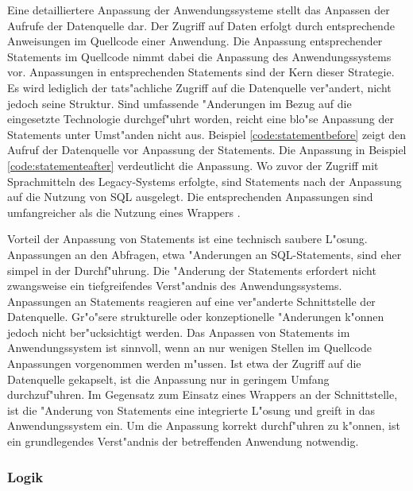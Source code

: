 Eine detailliertere Anpassung der Anwendungssysteme stellt das Anpassen der Aufrufe der Datenquelle dar. Der Zugriff auf Daten erfolgt durch entsprechende Anweisungen im Quellcode einer Anwendung. Die Anpassung entsprechender Statements im Quellcode nimmt dabei die Anpassung des Anwendungssystems vor. Anpassungen in entsprechenden Statements sind der Kern dieser Strategie. Es wird lediglich der tats"achliche Zugriff auf die Datenquelle ver"andert, nicht jedoch seine Struktur. Sind umfassende "Anderungen im Bezug auf die eingesetzte Technologie durchgef"uhrt worden, reicht eine blo"se Anpassung der Statements unter Umst"anden nicht aus.
\lb
Beispiel \ref{code:statementbefore} zeigt den Aufruf der Datenquelle vor Anpassung der Statements. Die Anpassung in Beispiel \ref{code:statementeafter} verdeutlicht die Anpassung. Wo zuvor der Zugriff mit Sprachmitteln des Legacy-Systems erfolgte, sind Statements nach der Anpassung auf die Nutzung von SQL ausgelegt. Die entsprechenden Anpassungen sind umfangreicher als die Nutzung eines Wrappers \citep{henrard-2002}.





Vorteil der Anpassung von Statements ist eine technisch saubere L"osung. Anpassungen an den Abfragen, etwa "Anderungen an SQL-Statements, sind eher simpel in der Durchf"uhrung. Die "Anderung der Statements erfordert nicht zwangsweise ein tiefgreifendes Verst"andnis des Anwendungssystems. 
\lb
Anpassungen an Statements reagieren auf eine ver"anderte Schnittstelle der Datenquelle. Gr"o"sere strukturelle oder konzeptionelle "Anderungen k"onnen jedoch nicht ber"ucksichtigt werden.
\lb
Das Anpassen von Statements im Anwendungssystem ist sinnvoll, wenn an nur wenigen Stellen im Quellcode Anpassungen vorgenommen werden m"ussen. Ist etwa der Zugriff auf die Datenquelle gekapselt, ist die Anpassung nur in geringem Umfang durchzuf"uhren. Im Gegensatz zum Einsatz eines Wrappers an der Schnittstelle, ist die "Anderung von Statements eine integrierte L"osung und greift in das Anwendungssystem ein. Um die Anpassung korrekt durchf"uhren zu k"onnen, ist ein grundlegendes Verst"andnis der betreffenden Anwendung notwendig.

\subsubsection{Logik}

